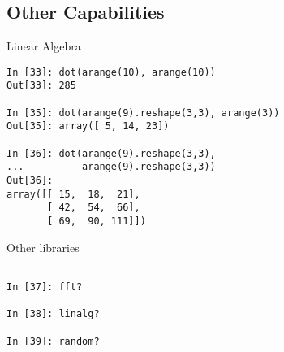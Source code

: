 \subsection{Other Capabilities}

\begin{frame}[fragile]
\begin{block}{Linear Algebra}
\begin{verbatim}
In [33]: dot(arange(10), arange(10))
Out[33]: 285

In [35]: dot(arange(9).reshape(3,3), arange(3))
Out[35]: array([ 5, 14, 23])

In [36]: dot(arange(9).reshape(3,3),
...          arange(9).reshape(3,3))
Out[36]:
array([[ 15,  18,  21],
       [ 42,  54,  66],
       [ 69,  90, 111]])
\end{verbatim}
\end{block}
\end{frame}

\begin{frame}[fragile]
\begin{block}{Other libraries}
\begin{verbatim}

In [37]: fft?

In [38]: linalg?

In [39]: random?
\end{verbatim}
\end{block}
\end{frame}
